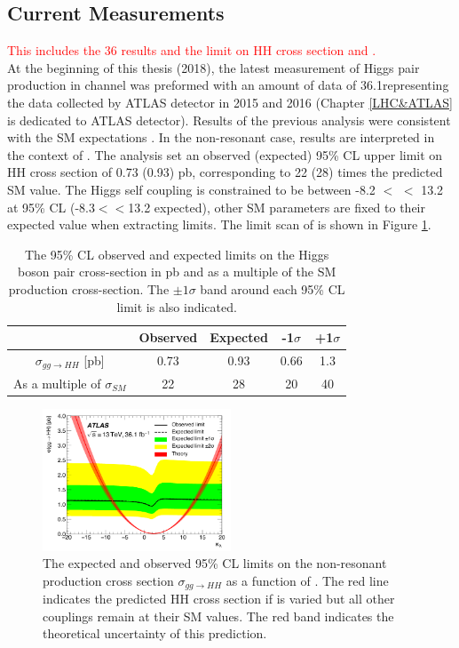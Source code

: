 \subsection{Current Measurements}
\label{chap1:HH:CM}
\textcolor{red}{This includes the 36 \ifb results and the limit on HH cross section and \kl.} \\
At the beginning of this thesis (2018), the latest measurement of Higgs pair production in \HHyybb channel was preformed with an amount of data of 36.1\ifb representing the data collected by ATLAS detector in 2015 and 2016 (Chapter \ref{LHC&ATLAS} is dedicated to ATLAS detector). Results of the previous analysis were consistent with the SM expectations \cite{yybb_36ifb}. In the non-resonant case, results are interpreted in the context of \kl. The analysis set an observed (expected) 95\% CL upper limit on HH cross section of 0.73 (0.93) pb, corresponding to 22 (28) times the predicted SM value. The Higgs self coupling is constrained to be between -8.2 $<$ \kl $<$ 13.2 at 95\% CL (-8.3$<$\kl$<$13.2 expected), other SM parameters are fixed to their expected value when extracting limits. The limit scan of \kl is shown in Figure \ref{fig:chap1:HH:CM:KL}. \\

\begin{table}[htbp]
    \centering
    \begin{tabular}{ccccc}
    \hline
         & Observed & Expected & -1$\sigma$ & +1$\sigma$ \\
    \hline
        $\sigma_{gg\rightarrow HH}$ [pb] & 0.73 & 0.93 & 0.66 & 1.3 \\
        As a multiple of $\sigma_{SM}$ & 22 & 28 & 20 & 40 \\
        \hline
    \end{tabular}
    \caption{The 95\% CL observed and expected limits on the Higgs boson pair cross-section in pb and as a multiple of the SM production cross-section. The $\pm1\sigma$ band around each 95\% CL limit is also indicated.}
    \label{tab:chap1:HH:CM:XSEC}
\end{table}
\begin{figure}[htbp]
    \centering
    \includegraphics[width=0.5\textwidth]{Ch1/Img/kl_36ifb.png}
    \caption{The expected and observed 95\% CL limits on the non-resonant production cross section $\sigma_{gg\rightarrow HH}$ as a function of \kl. The red line indicates the predicted HH cross section if \kl is varied but all other couplings remain at their SM values. The red band indicates the theoretical uncertainty of this prediction.}
    \label{fig:chap1:HH:CM:KL}
\end{figure}

